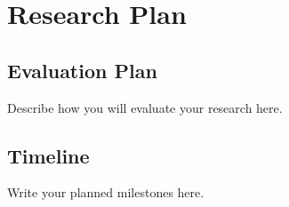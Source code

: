 \chapter{Research Plan}
\section{Evaluation Plan}
Describe how you will evaluate your research here.
\section{Timeline}
Write your planned milestones here.
